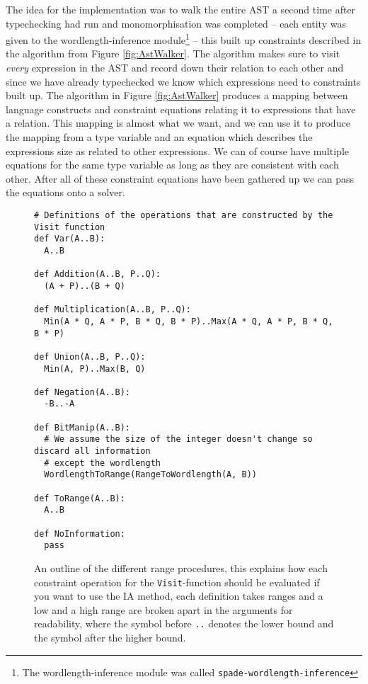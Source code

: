 The idea for the implementation was to walk the entire AST a second time after typechecking had run and monomorphisation was completed -- each entity was given to the wordlength-inference module\cprotect\footnote{The wordlength-inference module was called \verb+spade-wordlength-inference+} -- this built up constraints described in the algorithm from Figure \ref{fig:AstWalker}. The algorithm makes sure to visit \textit{every} expression in the AST and record down their relation to each other and since we have already typechecked we know which expressions need to constraints built up. The algorithm in Figure \ref{fig:AstWalker} produces a mapping between language constructs and constraint equations relating it to expressions that have a relation. This mapping is almost what we want, and we can use it to produce the mapping from a type variable and an equation which describes the expressions size as related to other expressions. We can of course have multiple equations for the same type variable as long as they are consistent with each other. After all of these constraint equations have been gathered up we can pass the equations onto a solver. 

\begin{figure}
\begin{verbatim}
# Definitions of the operations that are constructed by the Visit function
def Var(A..B):
  A..B

def Addition(A..B, P..Q):
  (A + P)..(B + Q)

def Multiplication(A..B, P..Q):
  Min(A * Q, A * P, B * Q, B * P)..Max(A * Q, A * P, B * Q, B * P)

def Union(A..B, P..Q):
  Min(A, P)..Max(B, Q)

def Negation(A..B):
  -B..-A

def BitManip(A..B):
  # We assume the size of the integer doesn't change so discard all information
  # except the wordlength
  WordlengthToRange(RangeToWordlength(A, B))

def ToRange(A..B):
  A..B

def NoInformation:
  pass

\end{verbatim}
  \cprotect\caption{An outline of the different range procedures, this explains how each constraint operation for the \verb+Visit+-function should be evaluated if you want to use the IA method, each definition takes ranges and a low and a high range are broken apart in the arguments for readability, where the symbol before \verb+..+ denotes the lower bound and the symbol after the higher bound.}
\label{fig:IaInference}
\end{figure}

